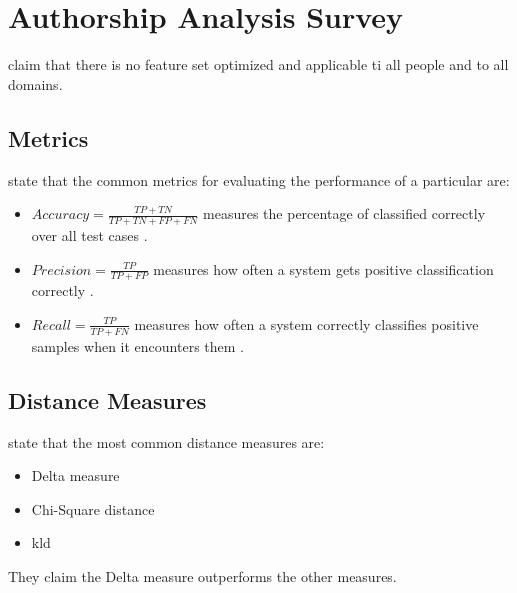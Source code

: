 \section{Authorship Analysis Survey}
\label{sec:authorship_analysis_survey}

\citet{elmanarelbouanani_authorship_2014} claim that there is no feature set optimized and applicable ti all people and to all domains.

\subsection{Metrics}
\citet{elmanarelbouanani_authorship_2014} state that the common metrics for evaluating the performance of a particular are:
\begin{itemize}
    \item $Accuracy = \frac{TP + TN}{TP + TN + FP + FN}$ \citep{elmanarelbouanani_authorship_2014,neal_surveying_2018} 
    measures the percentage of classified correctly over all test cases \citep{neal_surveying_2018}.

    \item $Precision = \frac{TP}{TP + FP}$ \citep{elmanarelbouanani_authorship_2014,neal_surveying_2018} 
    measures how often a system gets positive classification correctly \citep{neal_surveying_2018}.

    \item $Recall = \frac{TP}{TP + FN}$ \citep{elmanarelbouanani_authorship_2014,neal_surveying_2018} 
    measures how often a system correctly classifies positive samples when it encounters them \citep{neal_surveying_2018}.
\end{itemize}


\subsection{Distance Measures}
\citet{elmanarelbouanani_authorship_2014} state that the most common distance measures are:
\begin{itemize}
    \item Delta measure
    \item Chi-Square distance
    \item \ac{kld}
\end{itemize}
They claim the Delta measure outperforms the other measures.